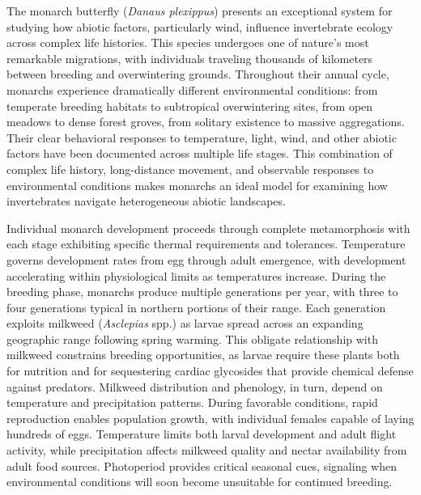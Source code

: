 The monarch butterfly (\textit{Danaus plexippus}) presents an exceptional system for studying how abiotic factors, particularly wind, influence invertebrate ecology across complex life histories. This species undergoes one of nature's most remarkable migrations, with individuals traveling thousands of kilometers between breeding and overwintering grounds. Throughout their annual cycle, monarchs experience dramatically different environmental conditions: from temperate breeding habitats to subtropical overwintering sites, from open meadows to dense forest groves, from solitary existence to massive aggregations. Their clear behavioral responses to temperature, light, wind, and other abiotic factors have been documented across multiple life stages. This combination of complex life history, long-distance movement, and observable responses to environmental conditions makes monarchs an ideal model for examining how invertebrates navigate heterogeneous abiotic landscapes.

Individual monarch development proceeds through complete metamorphosis with each stage exhibiting specific thermal requirements and tolerances. Temperature governs development rates from egg through adult emergence, with development accelerating within physiological limits as temperatures increase. During the breeding phase, monarchs produce multiple generations per year, with three to four generations typical in northern portions of their range. Each generation exploits milkweed (\textit{Asclepias} spp.) as larvae spread across an expanding geographic range following spring warming. This obligate relationship with milkweed constrains breeding opportunities, as larvae require these plants both for nutrition and for sequestering cardiac glycosides that provide chemical defense against predators. Milkweed distribution and phenology, in turn, depend on temperature and precipitation patterns. During favorable conditions, rapid reproduction enables population growth, with individual females capable of laying hundreds of eggs. Temperature limits both larval development and adult flight activity, while precipitation affects milkweed quality and nectar availability from adult food sources. Photoperiod provides critical seasonal cues, signaling when environmental conditions will soon become unsuitable for continued breeding.

